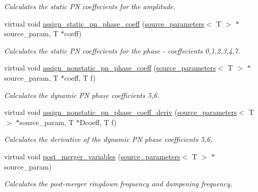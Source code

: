 \begin{DoxyCompactItemize}
\begin{DoxyCompactList}\small\item\em Calculates the static PN coeffecients for the amplitude. \end{DoxyCompactList}\item 
\mbox{\label{classIMRPhenomD_aaee6c205b4dbd79e12177656ad84744c}} 
virtual void \hyperlink{classIMRPhenomD_aaee6c205b4dbd79e12177656ad84744c}{assign\+\_\+static\+\_\+pn\+\_\+phase\+\_\+coeff} (\hyperlink{structsource__parameters}{source\+\_\+parameters}$<$ T $>$ $\ast$source\+\_\+param, T $\ast$coeff)
\begin{DoxyCompactList}\small\item\em Calculates the static PN coeffecients for the phase -\/ coeffecients 0,1,2,3,4,7. \end{DoxyCompactList}\item 
virtual void \hyperlink{classIMRPhenomD_a0fce09494daa1fee6be8297b8f18dec4}{assign\+\_\+nonstatic\+\_\+pn\+\_\+phase\+\_\+coeff} (\hyperlink{structsource__parameters}{source\+\_\+parameters}$<$ T $>$ $\ast$source\+\_\+param, T $\ast$coeff, T f)
\begin{DoxyCompactList}\small\item\em Calculates the dynamic PN phase coefficients 5,6. \end{DoxyCompactList}\item 
virtual void \hyperlink{classIMRPhenomD_aa10c5932742768573488dbdfa8526bff}{assign\+\_\+nonstatic\+\_\+pn\+\_\+phase\+\_\+coeff\+\_\+deriv} (\hyperlink{structsource__parameters}{source\+\_\+parameters}$<$ T $>$ $\ast$source\+\_\+param, T $\ast$Dcoeff, T f)
\begin{DoxyCompactList}\small\item\em Calculates the derivative of the dynamic PN phase coefficients 5,6. \end{DoxyCompactList}\item 
virtual void \hyperlink{classIMRPhenomD_a0d33a9a937a36f395300bab4276102af}{post\+\_\+merger\+\_\+variables} (\hyperlink{structsource__parameters}{source\+\_\+parameters}$<$ T $>$ $\ast$source\+\_\+param)
\begin{DoxyCompactList}\small\item\em Calculates the post-\/merger ringdown frequency and dampening frequency. \end{DoxyCompactList}\item 
\mbox{\label{classIMRPhenomD_a3561d291b8e089224eb53d81b19b954f}} 

\end{DoxyCompactItemize}

